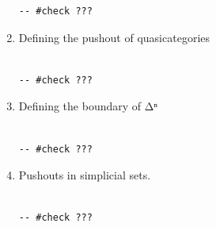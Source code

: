 \documentclass{book}
\theoremstyle{definition}
\newcounter{lcounter}
\begin{document}
\begin{enumerate}
\begin{center}
\begin{tcolorbox}[width=5in,colback={white},title={\begin{center}\texttt{Lean \thelcounter} \addtocounter{lcounter}{1}  \end{center}},colbacktitle=Blue,coltitle=black]
\begin{verbatim}
-- #check ???

\end{verbatim}
\end{tcolorbox}
\end{center}

\item Defining the pushout of quasicategories

\begin{center}
\begin{tcolorbox}[width=5in,colback={white},title={\begin{center}\texttt{Lean \thelcounter} \addtocounter{lcounter}{1}  \end{center}},colbacktitle=Blue,coltitle=black]
\begin{verbatim}

-- #check ???

\end{verbatim}
\end{tcolorbox}
\end{center}

\item Defining the boundary of Δⁿ

\begin{center}
\begin{tcolorbox}[width=5in,colback={white},title={\begin{center}\texttt{Lean \thelcounter} \addtocounter{lcounter}{1}  \end{center}},colbacktitle=Blue,coltitle=black]
\begin{verbatim}

-- #check ???

\end{verbatim}
\end{tcolorbox}
\end{center}


\item Pushouts in simplicial sets.

\begin{center}
\begin{tcolorbox}[width=5in,colback={white},title={\begin{center}\texttt{Lean \thelcounter} \addtocounter{lcounter}{1}  \end{center}},colbacktitle=Blue,coltitle=black]
\begin{verbatim}

-- #check ???


\end{verbatim}
\end{tcolorbox}
\end{center}
\end{enumerate}
\end{document}
